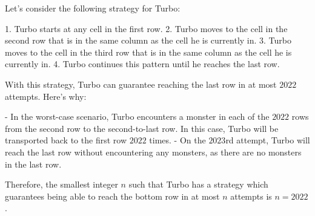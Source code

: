 Let's consider the following strategy for Turbo:

1. Turbo starts at any cell in the first row.
2. Turbo moves to the cell in the second row that is in the same column as the cell he is currently in.
3. Turbo moves to the cell in the third row that is in the same column as the cell he is currently in.
4. Turbo continues this pattern until he reaches the last row.

With this strategy, Turbo can guarantee reaching the last row in at most $2022$ attempts. Here's why:

- In the worst-case scenario, Turbo encounters a monster in each of the $2022$ rows from the second row to the second-to-last row. In this case, Turbo will be transported back to the first row $2022$ times.
- On the $2023$rd attempt, Turbo will reach the last row without encountering any monsters, as there are no monsters in the last row.

Therefore, the smallest integer $n$ such that Turbo has a strategy which guarantees being able to reach the bottom row in at most $n$ attempts is $n = 2022$.

